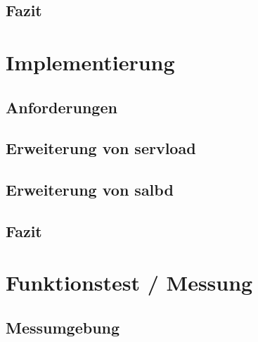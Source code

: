 \documentclass[a4paper, 11pt, toc=bibliography, toc=listof]{scrbook}
\begin{document}
		\section{Fazit} %
		\label{sec:Fazit}
		


	\chapter{Implementierung} %
	\label{cha:Implementierung}
		
		\section{Anforderungen} %
		\label{sec:Anforderungen}
			

		\section{Erweiterung von servload} %
		\label{sec:Erweiterung von servload}
			

		\section{Erweiterung von salbd} %
		\label{sec:Erweiterung von salbd}
			

		\section{Fazit} %
		\label{sec:Fazit}
		


	\chapter{Funktionstest / Messung} %
	\label{cha:Funktionstest}
	
		\section{Messumgebung} %
		\label{sec:Messumgebung}
			
\end{document}
